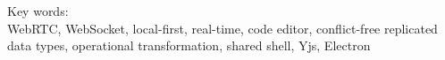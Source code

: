 \vspace*{0.2cm}

\noindent Key words: \\ WebRTC, WebSocket, local-first, real-time, code editor, conflict-free replicated data types, operational transformation, shared shell, Yjs, Electron \\

\newpage
